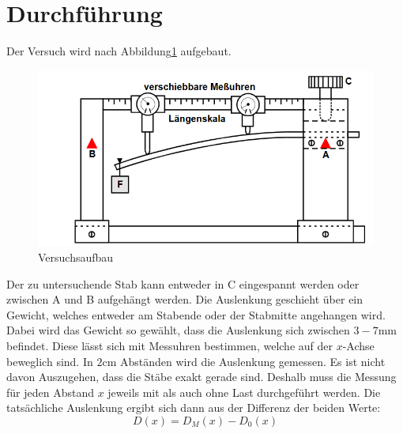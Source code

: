 \section{Durchführung}
Der Versuch wird nach Abbildung\ref{fig:aufbau} aufgebaut.
\begin{figure}
    \centering
    \includegraphics[width=\textwidth]{content/aufbau.png}
    \caption{Versuchsaufbau}
    \label{fig:aufbau}
\end{figure}
Der zu untersuchende Stab kann entweder in C eingespannt werden oder zwischen A und B aufgehängt werden.
Die Auslenkung geschieht über ein Gewicht, welches entweder am Stabende oder der Stabmitte angehangen wird.
Dabei wird das Gewicht so gewählt, dass die Auslenkung sich zwischen $3-7\si{\milli\meter}$ befindet.
Diese lässt sich mit Messuhren bestimmen, welche auf der $x$-Achse beweglich sind.
In $2\si{\centi\meter}$ Abständen wird die Auslenkung gemessen.
Es ist nicht davon Auszugehen, dass die Stäbe exakt gerade sind.
Deshalb muss die Messung für jeden Abstand $x$ jeweils mit als auch ohne Last durchgeführt werden.
Die tatsächliche Auslenkung ergibt sich dann aus der Differenz der beiden Werte:
\begin{equation}
  D(x)=D_M(x) - D_0(x)
\end{equation}
